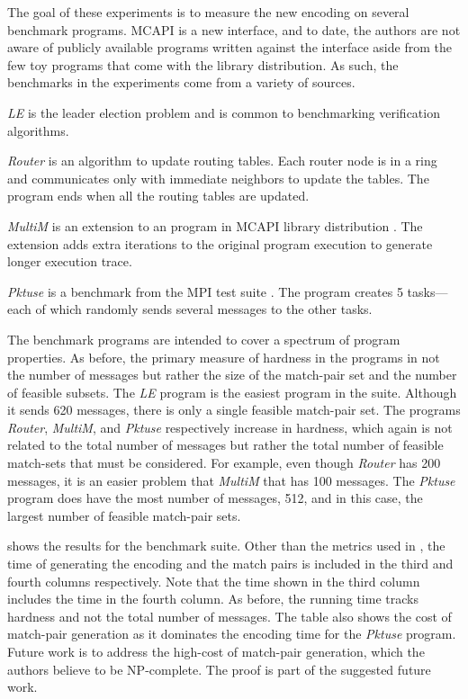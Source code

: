 The goal of these experiments is to measure the new encoding on several benchmark programs. MCAPI is a new interface, and to date, the authors are not aware of publicly available programs written against the interface aside from the few toy programs that come with the library distribution. As such, the benchmarks in the experiments come from a variety of sources. 
\begin{compactitem}
\item \textit{LE} is the leader election problem and is common to benchmarking verification algorithms. 
\item \textit{Router} is an algorithm to update routing tables. Each router node is in a ring and communicates only with immediate neighbors to update the tables. The program ends when all the routing tables are updated. 
\item \textit{MultiM} is an extension to an program in MCAPI library distribution . The extension adds extra iterations to the original program execution to generate longer execution trace. 
\item \textit{Pktuse} is a benchmark from the MPI test suite \cite{mpptest_benchmark}. The program creates 5 tasks---each of which randomly sends several messages to the other tasks.
\end{compactitem}

The benchmark programs are intended to cover a spectrum of program properties. As before, the primary measure of hardness in the programs in not the number of messages but rather the size of the match-pair set and the number of feasible subsets.  The \textit{LE} program is the easiest program in the suite. Although it sends 620 messages, there is only a single feasible match-pair set. The programs \textit{Router}, \textit{MultiM}, and \textit{Pktuse} respectively increase in hardness, which again is not related to the total number of messages but rather the total number of feasible match-sets that must be considered. For example, even though \textit{Router} has 200 messages, it is an easier problem that \textit{MultiM} that has 100 messages. The \textit{Pktuse} program does have the most number of messages, 512, and in this case, the largest number of feasible match-pair sets.

 shows the results for the benchmark suite. Other than the metrics used in , the time of generating the encoding and the match pairs is included in the third and fourth columns respectively. Note that the time shown in the third column includes the time in the fourth column. As before, the running time tracks hardness and not the total number of messages. The table also shows the cost of match-pair generation as it dominates the encoding time for the \textit{Pktuse} program. Future work is to address the high-cost of match-pair generation, which the authors believe to be NP-complete. The proof is part of the suggested future work.

